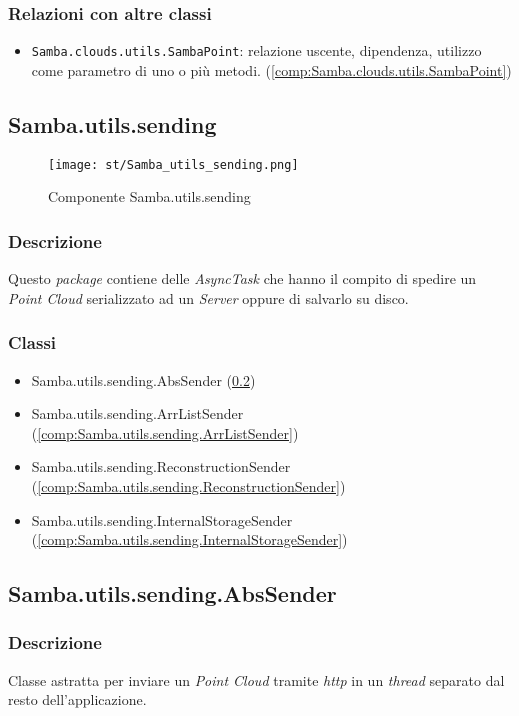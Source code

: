 \subsubsection{Relazioni con altre classi}
\begin{itemize}
	\item \texttt{Samba.clouds.utils.SambaPoint}: relazione uscente, dipendenza, utilizzo come parametro di uno o più metodi. (\ref{comp:Samba.clouds.utils.SambaPoint})
\end{itemize}


\newpage
\subsection{Samba.utils.sending}\label{comp:Samba.utils.sending}
\begin{figure}[H] 
    \centering 
    \texttt{[image: st/Samba\_utils\_sending.png]} 
    \caption{Componente Samba.utils.sending}
\end{figure}
\subsubsection{Descrizione}
Questo \emph{package} contiene delle \emph{AsyncTask} che hanno il compito di spedire un \emph{Point Cloud} serializzato ad un \emph{Server} oppure di salvarlo su disco.
\subsubsection{Classi}
\begin{itemize}
	\item Samba.utils.sending.AbsSender (\ref{comp:Samba.utils.sending.AbsSender})
	\item Samba.utils.sending.ArrListSender (\ref{comp:Samba.utils.sending.ArrListSender})
	\item Samba.utils.sending.ReconstructionSender (\ref{comp:Samba.utils.sending.ReconstructionSender})
	\item Samba.utils.sending.InternalStorageSender (\ref{comp:Samba.utils.sending.InternalStorageSender})
\end{itemize}

\subsection{Samba.utils.sending.AbsSender}\label{comp:Samba.utils.sending.AbsSender}
\subsubsection{Descrizione}
Classe astratta per inviare un \emph{Point Cloud} tramite \emph{http} in un \emph{thread} separato dal resto dell'applicazione.

